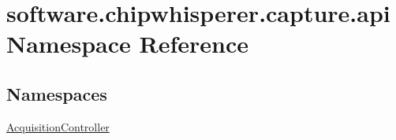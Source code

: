 \hypertarget{namespacesoftware_1_1chipwhisperer_1_1capture_1_1api}{}\section{software.\+chipwhisperer.\+capture.\+api Namespace Reference}
\label{namespacesoftware_1_1chipwhisperer_1_1capture_1_1api}
\subsection*{Namespaces}
\begin{DoxyCompactItemize}
\item 
 \hyperlink{namespacesoftware_1_1chipwhisperer_1_1capture_1_1api_1_1AcquisitionController}{Acquisition\+Controller}
\end{DoxyCompactItemize}
